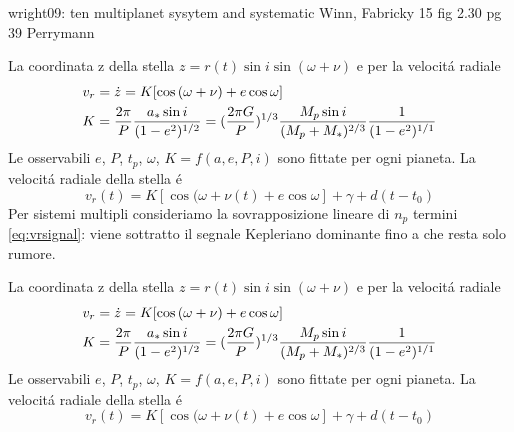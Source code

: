 \begin{workout}
wright09: ten multiplanet sysytem and systematic
Winn, Fabricky 15
fig 2.30 pg 39 Perrymann
\end{workout}


\begin{workout}
La coordinata z della stella $z=r(t)\sin{i}\sin{(\omega+\nu)}$ e per la velocit\'a radiale
\begin{align}
&v_r=\dot{z}=K[\cos{(\omega+\nu)}+e\cos{\omega}]\\
&K=\frac{2\pi}{P}\frac{a_*\sin{i}}{(1-e^2)^{1/2}}=(\frac{2\pi G}{P})^{1/3}\frac{M_p\sin{i}}{(M_p+M_*)^{2/3}}\frac{1}{(1-e^2)^{1/1}}
\end{align}
Le osservabili $e$, $P$, $t_p$, $\omega$, $K=f(a,e,P,i)$ sono fittate per ogni pianeta.
La velocit\'a radiale della stella \'e
\begin{equation}
v_r(t)=K[\cos{(\omega+\nu(t)}+e\cos{\omega}]+\gamma+d(t-t_0)
\end{equation}
Per sistemi multipli consideriamo la sovrapposizione lineare di $n_p$ termini \eqref{eq:vrsignal}: viene sottratto il segnale Kepleriano dominante fino a che resta solo rumore.
\end{workout}

\begin{workout}
La coordinata z della stella $z=r(t)\sin{i}\sin{(\omega+\nu)}$ e per la velocit\'a radiale
\begin{align}
&v_r=\dot{z}=K[\cos{(\omega+\nu)}+e\cos{\omega}]\\
&K=\frac{2\pi}{P}\frac{a_*\sin{i}}{(1-e^2)^{1/2}}=(\frac{2\pi G}{P})^{1/3}\frac{M_p\sin{i}}{(M_p+M_*)^{2/3}}\frac{1}{(1-e^2)^{1/1}}
\end{align}
Le osservabili $e$, $P$, $t_p$, $\omega$, $K=f(a,e,P,i)$ sono fittate per ogni pianeta.
La velocit\'a radiale della stella \'e
\begin{equation}
v_r(t)=K[\cos{(\omega+\nu(t)}+e\cos{\omega}]+\gamma+d(t-t_0)
\end{equation}
\end{workout}

